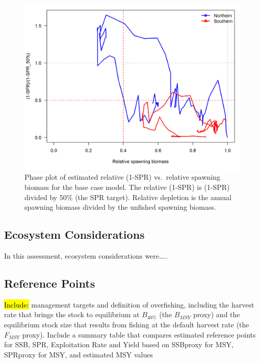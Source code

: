 \documentclass[12pt,]{article}
\begin{document}
\begin{figure}[htbp]
\centering
\includegraphics{r4ss/plots_compare/base_compare13_phase_plot.png}
\caption{Phase plot of estimated relative (1-SPR) vs.~relative spawning
biomass for the base case model. The relative (1-SPR) is (1-SPR) divided
by 50\% (the SPR target). Relative depletion is the annual spawning
biomass divided by the unfished spawning biomass. \label{fig:Phase_all}}
\end{figure}

\FloatBarrier

\subsection*{Ecosystem Considerations}\label{ecosystem-considerations}

In this assessment, ecosystem considerations were\ldots{}..

\subsection*{Reference Points}\label{reference-points}

\hl{Include:} management targets and definition of overfishing,
including the harvest rate that brings the stock to equilibrium at
\(B_{40\%}\) (the \(B_{MSY}\) proxy) and the equilibrium stock size that
results from fishing at the default harvest rate (the \(F_{MSY}\)
proxy). Include a summary table that compares estimated reference points
for SSB, SPR, Exploitation Rate and Yield based on SSBproxy for MSY,
SPRproxy for MSY, and estimated MSY values
\end{document}
